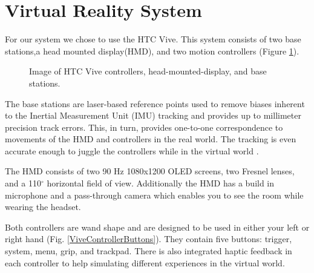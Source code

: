 \documentclass[journal]{IEEEtran}
\begin{document}
\section{Virtual Reality System}

For our system we chose to use the HTC Vive\cite{htc_vive}. This system consists of two base stations,a head mounted display(HMD), and two motion controllers (Figure \ref{htc_vive}).


\begin{figure}[H]

	\noindent
	\caption{Image of HTC Vive controllers, head-mounted-display, and base stations.\cite{htc_vive_system_image}}\label{htc_vive}
\end{figure}


The base stations are laser-based reference points used to remove biases inherent to the Inertial Measurement Unit (IMU) tracking and provides up to millimeter precision track errors. This, in turn, provides one-to-one correspondence to movements of the HMD and controllers in the real world. The tracking is even accurate enough to juggle the controllers while in the virtual world \cite{juggline_htc_vive_controllers}. 

The HMD consists of two 90 Hz 1080x1200 OLED screens, two Fresnel lenses, and a 110$^{\circ}$  horizontal field of view\cite{htc_vive_system_specs}.  Additionally the HMD has a build in microphone and a pass-through camera which enables you to see the room while wearing the headset. 

Both controllers are wand shape and are designed to be used in either your left or right hand (Fig. \ref{ViveControllerButtons}). They contain five buttons: trigger, system, menu, grip, and trackpad. There is also integrated haptic feedback in each controller to help simulating different experiences in the virtual world. 
\end{document}

